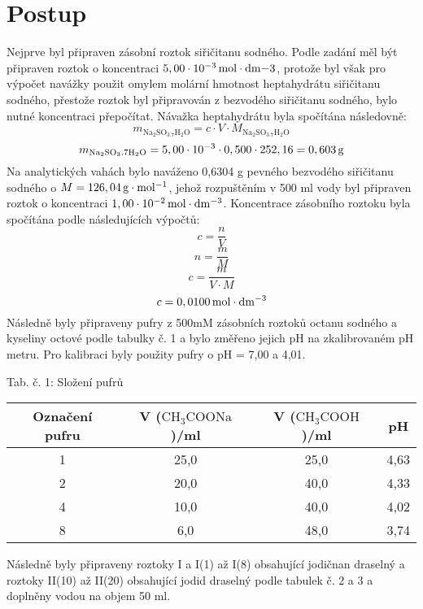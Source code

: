 \documentclass[12pt,a4paper]{article}
\def\ri#1{\mathrm{#1}}
\def\jd#1{\ifmmode\,\mathrm{#1}\else\,\textrm{#1}\fi}
\begin{document}
\section*{Postup}
\noindent Nejprve byl připraven zásobní roztok siřičitanu sodného. Podle zadání měl být připraven roztok o koncentraci $5,00\cdot 10^{-3}\jd{mol\cdot dm{-3}}$, protože byl však pro výpočet navážky použit omylem molární hmotnost heptahydrátu siřičitanu sodného, přestože roztok byl připravován z bezvodého siřičitanu sodného, bylo nutné koncentraci přepočítat. Návažka heptahydrátu byla spočítána následovně:
\begin{equation}
	m_\ri{Na_2SO_3.7H_2O} = c\cdot V\cdot M_\ri{Na_2SO_3.7H_2O}
\end{equation}
$$m_\ri{Na_2SO_3.7H_2O} = 5,00\cdot 10^{-3}\cdot 0,500\cdot 252,16 = 0,603\jd{g}$$
Na analytických vahách bylo naváženo 0,6304\jd{g} pevného bezvodého siřičitanu sodného o $M=126,04\jd{g\cdot mol^\ri{-1}}$, jehož rozpuštěním v 500\jd{ml} vody byl připraven roztok o koncentraci $1,00\cdot 10^\ri{-2}\jd{mol\cdot dm^\ri{-3}}$. Koncentrace zásobního roztoku byla spočítána podle následujících výpočtů:
\begin{equation}
	c = \dfrac{n}{V}
\end{equation}
\begin{equation}
	n = \dfrac{m}{M}
\end{equation}
\begin{equation}
	c = \dfrac{m}{V\cdot M}
\end{equation} 
$$c = 0,0100\jd{mol\cdot dm^\ri{-3}}$$
Následně byly připraveny pufry z 500mM zásobních roztoků octanu sodného a kyseliny octové podle tabulky č. 1 a bylo změřeno jejich pH na zkalibrovaném pH metru. Pro kalibraci byly použity pufry o pH = 7,00 a 4,01.
\begin{center}
	\noindent Tab. č. 1: Složení pufrů\\
	\begin{tabular}{c|c|c|c}
		Označení pufru & V ($\ri{CH_3COONa}$)/ml & V ($\ri{CH_3COOH}$)/ml & pH\\
		\hline
		1 & 25,0 & 25,0 & 4,63\\
		2 & 20,0 & 40,0 & 4,33\\
		4 & 10,0 & 40,0 & 4,02\\
		8 & 6,0 & 48,0 & 3,74\\
	\end{tabular}
\end{center} 
Následně byly připraveny roztoky I a I(1) až I(8) obsahující jodičnan draselný a roztoky II(10) až II(20) obsahující jodid draselný podle tabulek č. 2 a 3 a doplněny vodou na objem 50\jd{ml}.
\end{document}
